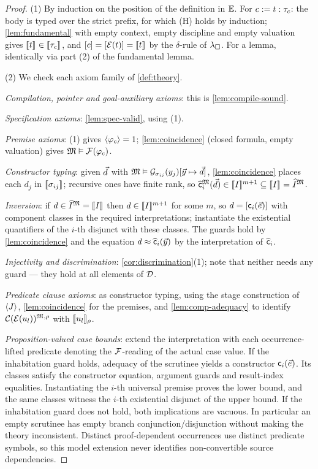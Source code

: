 \begin{proof}
(1) By induction on the position of the definition in $\mathbb{E}$.  For $c
\mathrel{:=} t : \tau_c$: the body is typed over the strict prefix, for which
(H) holds by induction; \cref{lem:fundamental} with empty context, empty
discipline and empty valuation gives $[\![ t ]\!]_{} \in [\![ \tau_c ]\!]_{}$,
and $[c] = [\mathcal{E}(t)] = [\![ t ]\!]_{}$ by the $\delta$-rule of
$\lambda_{\square}$.  For a lemma, identically via part (2) of the fundamental lemma.

(2) We check each axiom family of \cref{def:theory}.

\emph{Compilation, pointer and goal-auxiliary axioms}: this is
\cref{lem:compile-sound}.

\emph{Specification axioms}: \cref{lem:spec-valid}, using (1).

\emph{Premise axioms}: (1) gives $\langle \varphi_c \rangle = 1$;
\cref{lem:coincidence} (closed formula, empty valuation) gives $\mathfrak{M}
\vDash \mathcal{F}(\varphi_c)$.

\emph{Constructor typing}: given $\vec{d}$ with $\mathfrak{M} \vDash
\mathcal{G}_{\sigma_{ij}}(y_j)[\vec{y} \mapsto \vec{d}]$,
\cref{lem:coincidence} places each $d_j$ in
$[\![ \sigma_{ij} ]\!]_{}$; recursive ones have finite rank, so
$\widehat{\mathsf{c}}_i^{\mathfrak{M}}(\vec{d}) \in [\![ I ]\!]^{m+1} \subseteq [\![ I ]\!]_{}
= \widehat{I}^{\mathfrak{M}}$.

\emph{Inversion}: if $d \in \widehat{I}^{\mathfrak{M}} = [\![ I ]\!]_{}$ then $d \in
[\![ I ]\!]^{m+1}$ for some $m$, so $d = [\mathsf{c}_i(\vec{e})]$ with
component classes in the required interpretations; instantiate the
existential quantifiers of the $i$-th disjunct with these classes.  The
guards hold by \cref{lem:coincidence} and the equation $d \approx
\widehat{\mathsf{c}}_i(\vec{y})$ by the interpretation of
$\widehat{\mathsf{c}}_i$.

\emph{Injectivity and discrimination}: \cref{cor:discrimination}(1);
note that neither needs any guard --- they hold at all elements of
$\mathcal{D}$.

\emph{Predicate clause axioms}: as constructor typing, using the stage
construction of $\langle J \rangle$, \cref{lem:coincidence} for the premises, and
\cref{lem:comp-adequacy} to identify $\mathcal{C}(\mathcal{E}(u_l))^{\mathfrak{M},\rho}$
with $[\![ u_l ]\!]_\rho$.

\emph{Proposition-valued case bounds}: extend the interpretation with each
occurrence-lifted predicate denoting the $\mathcal{F}$-reading of the actual case
value.  If the inhabitation guard holds, adequacy of the scrutinee yields a
constructor $\mathsf{c}_i(\vec{e})$.  Its classes satisfy the constructor
equation, argument guards and result-index equalities.  Instantiating the
$i$-th universal premise proves the lower bound, and the same classes witness
the $i$-th existential disjunct of the upper bound.  If the inhabitation guard
does not hold, both implications are vacuous.  In particular an empty
scrutinee has empty branch conjunction/disjunction without making the theory
inconsistent.  Distinct proof-dependent occurrences use distinct predicate
symbols, so this model extension never identifies non-convertible source
dependencies.


\end{proof}
